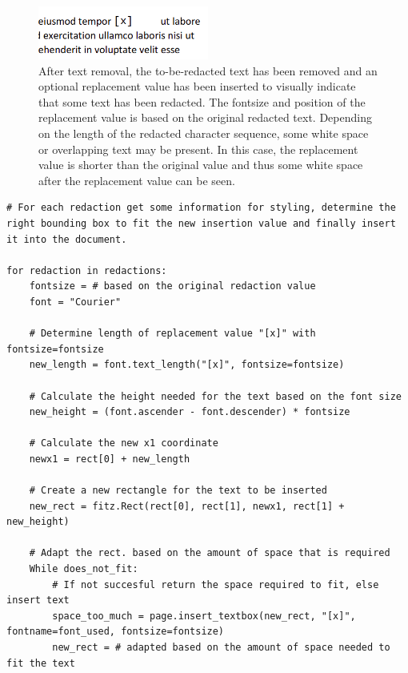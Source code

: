 \begin{figure}[h]
\includegraphics[width=0.5\textwidth]{latex/media/redactreplace.png}
\centering
\caption{After text removal, the to-be-redacted text has been removed and an optional replacement value has been inserted to visually indicate that some text has been redacted. The fontsize and position of the replacement value is based on the original redacted text. Depending on the length of the redacted character sequence, some white space or overlapping text may be present. In this case, the replacement value is shorter than the original value and thus some white space after the replacement value can be seen.}
\label{fig:replacement}
\end{figure}
\begin{lstlisting}[style=CStyle, caption=Pseudocode for adding replacement text in place for the redacted text. The style of the replacement text is based on the original text. The bounding box which is used to insert the text in the document may be adapted to fit the text and position it correctly relative to other text.]
# For each redaction get some information for styling, determine the right bounding box to fit the new insertion value and finally insert it into the document.

for redaction in redactions:
    fontsize = # based on the original redaction value
    font = "Courier" 

    # Determine length of replacement value "[x]" with fontsize=fontsize
    new_length = font.text_length("[x]", fontsize=fontsize)

    # Calculate the height needed for the text based on the font size
    new_height = (font.ascender - font.descender) * fontsize

    # Calculate the new x1 coordinate
    newx1 = rect[0] + new_length

    # Create a new rectangle for the text to be inserted
    new_rect = fitz.Rect(rect[0], rect[1], newx1, rect[1] + new_height)

    # Adapt the rect. based on the amount of space that is required
    While does_not_fit:
        # If not succesful return the space required to fit, else insert text
        space_too_much = page.insert_textbox(new_rect, "[x]", fontname=font_used, fontsize=fontsize)
        new_rect = # adapted based on the amount of space needed to fit the text

\end{lstlisting}


